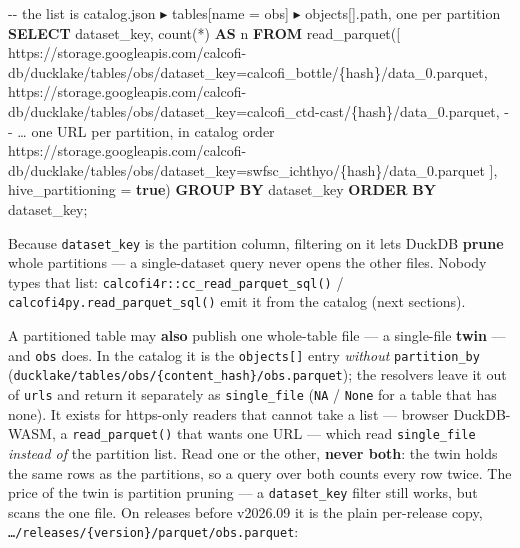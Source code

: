 \documentclass[
  letterpaper,
  DIV=11,
  numbers=noendperiod]{scrreprt}
\newenvironment{Shaded}{\begin{snugshade}}{\end{snugshade}}
\newcommand{\CommentTok}[1]{\textcolor[rgb]{0.37,0.37,0.37}{#1}}
\newcommand{\FunctionTok}[1]{\textcolor[rgb]{0.28,0.35,0.67}{#1}}
\newcommand{\KeywordTok}[1]{\textcolor[rgb]{0.00,0.23,0.31}{\textbf{#1}}}
\newcommand{\NormalTok}[1]{\textcolor[rgb]{0.00,0.23,0.31}{#1}}
\newcommand{\OperatorTok}[1]{\textcolor[rgb]{0.37,0.37,0.37}{#1}}
\newcommand{\StringTok}[1]{\textcolor[rgb]{0.13,0.47,0.30}{#1}}
\begin{document}
\begin{Shaded}
\begin{Highlighting}[]
\CommentTok{{-}{-} the list is catalog.json ▸ tables[name = \textquotesingle{}obs\textquotesingle{}] ▸ objects[].path, one per partition}
\KeywordTok{SELECT}\NormalTok{ dataset\_key, }\FunctionTok{count}\NormalTok{(}\OperatorTok{*}\NormalTok{) }\KeywordTok{AS}\NormalTok{ n}
\KeywordTok{FROM}\NormalTok{ read\_parquet([}
    \StringTok{\textquotesingle{}https://storage.googleapis.com/calcofi{-}db/ducklake/tables/obs/dataset\_key=calcofi\_bottle/\{hash\}/data\_0.parquet\textquotesingle{}}\NormalTok{,}
    \StringTok{\textquotesingle{}https://storage.googleapis.com/calcofi{-}db/ducklake/tables/obs/dataset\_key=calcofi\_ctd{-}cast/\{hash\}/data\_0.parquet\textquotesingle{}}\NormalTok{,}
    \CommentTok{{-}{-} … one URL per partition, in catalog order}
    \StringTok{\textquotesingle{}https://storage.googleapis.com/calcofi{-}db/ducklake/tables/obs/dataset\_key=swfsc\_ichthyo/\{hash\}/data\_0.parquet\textquotesingle{}}
\NormalTok{  ], hive\_partitioning }\OperatorTok{=} \KeywordTok{true}\NormalTok{)}
\KeywordTok{GROUP} \KeywordTok{BY}\NormalTok{ dataset\_key}
\KeywordTok{ORDER} \KeywordTok{BY}\NormalTok{ dataset\_key;}
\end{Highlighting}
\end{Shaded}

Because \texttt{dataset\_key} is the partition column, filtering on it
lets DuckDB \textbf{prune} whole partitions --- a single-dataset query
never opens the other files. Nobody types that list:
\texttt{calcofi4r::cc\_read\_parquet\_sql()} /
\texttt{calcofi4py.read\_parquet\_sql()} emit it from the catalog (next
sections).

A partitioned table may \textbf{also} publish one whole-table file --- a
single-file \textbf{twin} --- and \texttt{obs} does. In the catalog it
is the \texttt{objects{[}{]}} entry \emph{without}
\texttt{partition\_by}
(\texttt{ducklake/tables/obs/\{content\_hash\}/obs.parquet}); the
resolvers leave it out of \texttt{urls} and return it separately as
\texttt{single\_file} (\texttt{NA} / \texttt{None} for a table that has
none). It exists for https-only readers that cannot take a list ---
browser DuckDB-WASM, a \texttt{read\_parquet()} that wants one URL ---
which read \texttt{single\_file} \emph{instead of} the partition list.
Read one or the other, \textbf{never both}: the twin holds the same rows
as the partitions, so a query over both counts every row twice. The
price of the twin is partition pruning --- a \texttt{dataset\_key}
filter still works, but scans the one file. On releases before v2026.09
it is the plain per-release copy,
\texttt{…/releases/\{version\}/parquet/obs.parquet}:
\end{document}
